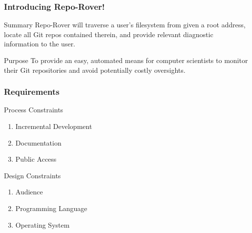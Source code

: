 \begin{frame}
	\centering
	\frametitle{Introducing Repo-Rover!}
	\begin{block}{Summary}
		Repo-Rover will traverse a user's filesystem from given a root address, locate all Git repos contained therein, and provide relevant diagnostic information to the user.
	\end{block}
	
	
		\pause
	\begin{block}{Purpose}
			To provide an easy, automated means for computer scientists to monitor their Git repositories and avoid potentially costly oversights.
	\end{block}
\end{frame}

\begin{frame}
	\centering
	\frametitle{Requirements}
	\begin{block}{Process Constraints}
		\begin{enumerate}
			\item Incremental Development
			\item Documentation
			\item Public Access
		\end{enumerate}
	\end{block}
	\pause
	\begin{block}{Design Constraints}
		\begin{enumerate}
			\item Audience
			\item Programming Language
			\item Operating System
		\end{enumerate}
	\end{block}
\end{frame}

